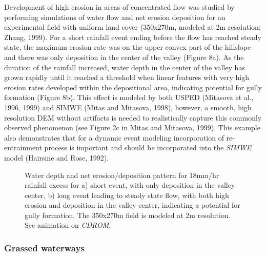 \documentclass{kapedbk} %
\begin{document}
\medskip
Development of high erosion
in areas of concentrated flow was studied
by performing simulations of water flow and net erosion deposition
for an experimental field with uniform land cover
(350x270m, modeled at 2m resolution; Zhang, 1999).
For a short rainfall event ending before the flow has reached
steady state, the maximum erosion rate was on the
upper convex part of the hillslope and there was only
deposition in the center of the valley (Figure 8a).
As the duration of the rainfall increased,
water depth in the center of the valley has grown
rapidly until it reached
a threshold when linear features with very high erosion rates
 developed within the depositional area,
indicating potential for gully formation (Figure 8b).
This effect is modeled by both USPED (Mitasova et al., 1996, 1999)
and SIMWE (Mitas and Mitasova, 1998), however, a smooth, high resolution 
DEM without artifacts is needed to realistically capture
this commonly observed phenomenon (see Figure 2c in Mitas and Mitasova, 1999).
This example also demonstrates that for a dynamic event modeling
incorporation of re-entrainment process is important and should be
incorporated into the {\sl SIMWE} model (Hairsine and Rose, 1992).

\begin{figure}[h]
\centerline{}
\caption{  Water depth and net erosion/deposition pattern for
18mm/hr rainfall excess for a) short event, with only deposition
in the valley center, b) long event leading to steady state flow, with
both high erosion and deposition in the valley center,
indicating a potential for gully formation.
The 350x270m field is modeled at 2m resolution. See animation 
on {\sl CDROM}.}
\end{figure}

\medskip\noindent
\subsubsection {Grassed waterways} 

\quad
\end{document}
